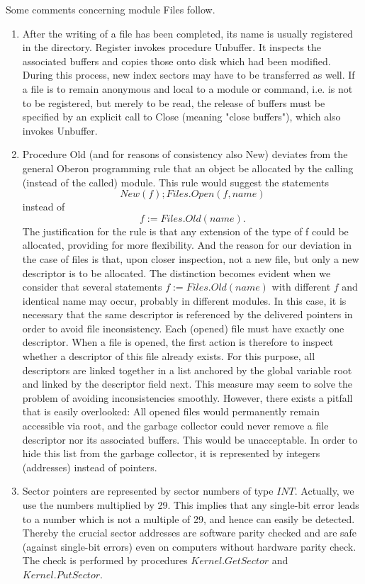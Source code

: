 Some comments concerning module Files follow.
\begin{enumerate}
	\item After the writing of a file has been completed, its name is usually registered in the directory.
Register invokes procedure Unbuffer. It inspects the associated buffers and copies those onto
disk which had been modified. During this process, new index sectors may have to be transferred
as well. If a file is to remain anonymous and local to a module or command, i.e. is not to be
registered, but merely to be read, the release of buffers must be specified by an explicit call to
Close (meaning "close buffers"), which also invokes Unbuffer.
	\item Procedure Old (and for reasons of consistency also New) deviates from the general Oberon
programming rule that an object be allocated by the calling (instead of the called) module. This
rule would suggest the statements
\[ New(f); Files.Open(f, name) \] instead of \[ f := Files.Old(name). \] The justification for the rule is that any extension of the type of f
could be allocated, providing for more flexibility. And the reason for our deviation in the case of
files is that, upon closer inspection, not a new file, but only a new descriptor is to be allocated.
The distinction becomes evident when we consider that several statements
$f := Files.Old(name)$ with different $f$ and identical name may occur, probably in different modules. In this case, it is
necessary that the same descriptor is referenced by the delivered pointers in order to avoid file
inconsistency. Each (opened) file must have exactly one descriptor. When a file is opened, the
first action is therefore to inspect whether a descriptor of this file already exists. For this purpose,
all descriptors are linked together in a list anchored by the global variable root and linked by the
descriptor field next. This measure may seem to solve the problem of avoiding inconsistencies
smoothly. However, there exists a pitfall that is easily overlooked: All opened files would
permanently remain accessible via root, and the garbage collector could never remove a file
descriptor nor its associated buffers. This would be unacceptable. In order to hide this list from
the garbage collector, it is represented by integers (addresses) instead of pointers.
	\item Sector pointers are represented by sector numbers of type $INT$. Actually, we use the
numbers multiplied by 29. This implies that any single-bit error leads to a number which is not a
multiple of 29, and hence can easily be detected. Thereby the crucial sector addresses are
software parity checked and are safe (against single-bit errors) even on computers without
hardware parity check. The check is performed by procedures $Kernel.GetSector$ and $Kernel.PutSector$.
\end{enumerate}
